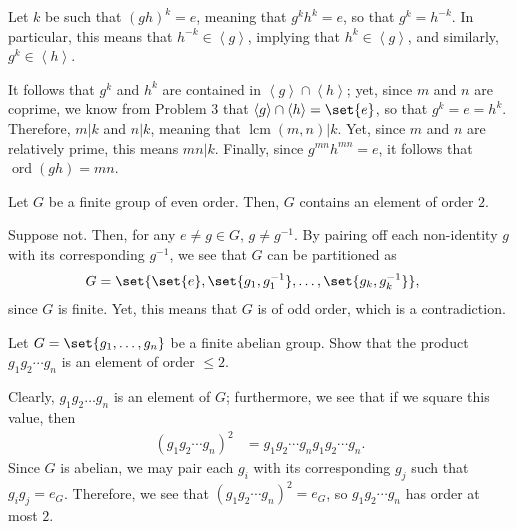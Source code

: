 \documentclass[10pt]{mypackage}
\begin{document}
\begin{solution}
  Let $k$ be such that $\left( gh \right)^{k} = e$, meaning that $g^{k}h^{k} = e$, so that $g^{k} = h^{-k}$. In particular, this means that $h^{-k}\in \left\langle g \right\rangle$, implying that $h^{k}\in \left\langle g \right\rangle$, and similarly, $ g^{k}\in \left\langle h \right\rangle $.\newline

  It follows that $g^{k}$ and $h^{k}$ are contained in $ \left\langle g \right\rangle \cap \left\langle h \right\rangle $; yet, since $m$ and $n$ are coprime, we know from Problem 3 that $ \left\langle g \right\rangle \cap \left\langle h \right\rangle = \set{e}$, so that $g^{k} = e = h^{k}$. Therefore, $ m | k $ and $ n | k $, meaning that $ \operatorname{lcm}\left( m,n \right) | k $. Yet, since $m$ and $n$ are relatively prime, this means $ mn | k $. Finally, since $g^{mn}h^{mn} = e$, it follows that $ \operatorname{ord}\left( gh \right) = mn $.
\end{solution}
\begin{problem}[Problem 6]
  Let $G$ be a finite group of even order. Then, $G$ contains an element of order $2$.
\end{problem}
\begin{solution}
  Suppose not. Then, for any $e\neq g\in G$, $g \neq g^{-1}$. By pairing off each non-identity $g$ with its corresponding $g^{-1}$, we see that $G$ can be partitioned as
  \begin{align*}
    G &= \set{\set{e},\set{g_1,g_1^{-1}},\dots,\set{g_{k},g_{k}^{-1}}},
  \end{align*}
  since $G$ is finite. Yet, this means that $G$ is of odd order, which is a contradiction.
\end{solution}
\begin{problem}[Problem 7]
  Let $G = \set{g_1,\dots,g_n}$ be a finite abelian group. Show that the product $g_1g_2\cdots g_n$ is an element of order $\leq 2$.
\end{problem}
\begin{solution}
  Clearly, $g_1g_2\dots g_n$ is an element of $G$; furthermore, we see that if we square this value, then
  \begin{align*}
    \left( g_1g_2\cdots g_n \right)^2 &= g_1g_2\cdots g_n g_1g_2\cdots g_n.
  \end{align*}
  Since $G$ is abelian, we may pair each $g_i$ with its corresponding $g_j$ such that $g_ig_j = e_{G}$. Therefore, we see that $\left( g_1g_2\cdots g_n \right)^2 = e_G$, so $g_1g_2\cdots g_n$ has order at most $2$.
\end{solution}
\end{document}
